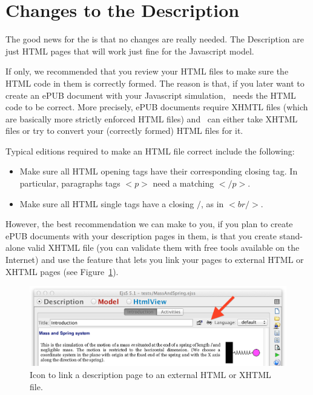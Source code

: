     \section{Changes to the Description}\label{section:04Description}

The good news for the  is that no changes are really needed. The Description are just HTML pages that will work just fine for the Javascript model.

If only, we recommended that you review your HTML files to make sure the HTML code in them is correctly formed. The reason is that, if you later want to create an ePUB document with your Javascript simulation, \ejs\ needs the HTML code to be correct. More precisely, ePUB documents require XHMTL files (which are basically more strictly enforced HTML files) and \ejs\ can either take XHTML files or try to convert your (correctly formed) HTML files for it.

Typical editions required to make an HTML file correct include the following:

\begin{itemize}
  \item Make sure all HTML opening tags have their corresponding closing tag. In particular, paragraphs tags $<p>$ need a matching  $</p>$.
  \item Make sure all HTML single tags have a closing $/$, as in $<br />$.
\end{itemize}
\noindent However, the best recommendation we can make to you, if you plan to create ePUB documents with your description pages in them, is that you create stand-alone valid XHTML file (you can validate them with free tools available on the Internet) and use the  feature that lets you link your pages to external HTML or XHTML pages (see Figure~\ref{fig:04JavatoJS/LinkHTMLPage}). 

\begin{figure}[htb]
  \centering
  \includegraphics[scale=\scale]{04JavatoJS/images/LinkHTMLPage.png}
  \caption{Icon to link a description page to an external HTML or XHTML file.}
  \label{fig:04JavatoJS/LinkHTMLPage}
\end{figure}

